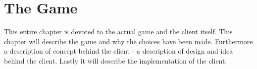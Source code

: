 \chapter{The Game}

This entire chapter is devoted to the actual game and the client itself. This chapter will describe the game and why the choices have been made. Furthermore a description of concept behind the client - a description of design and idea behind the client. Lastly it will describe the implementation of the client.




